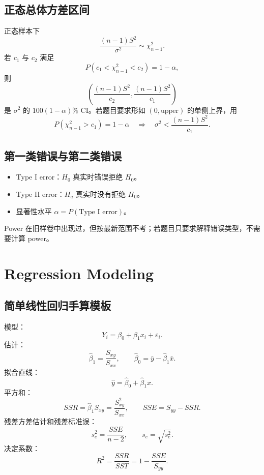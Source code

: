 \documentclass[11pt,a4paper]{article}
\begin{document}
\subsection{正态总体方差区间}

\begin{templatebox}[若题目要求方差的区间估计]
正态样本下
\[
  \frac{(n-1)S^2}{\sigma^2}\sim\chi^2_{n-1}.
\]
若 $c_1$ 与 $c_2$ 满足
\[
  P(c_1<\chi^2_{n-1}<c_2)=1-\alpha,
\]
则
\[
  \boxed{
  \left(
    \frac{(n-1)S^2}{c_2},
    \frac{(n-1)S^2}{c_1}
  \right)
  }
\]
是 $\sigma^2$ 的 $100(1-\alpha)\%$ CI。若题目要求形如 $(0,\mathrm{upper})$ 的单侧上界，用
\[
  P\!\left(\chi^2_{n-1}>c_1\right)=1-\alpha
  \quad\Rightarrow\quad
  \sigma^2<\frac{(n-1)S^2}{c_1}.
\]
\end{templatebox}

\subsection{第一类错误与第二类错误}

\begin{memorybox}[定义]
\begin{itemize}
  \item Type I error：$H_0$ 真实时错误拒绝 $H_0$。
  \item Type II error：$H_a$ 真实时没有拒绝 $H_0$。
  \item 显著性水平 $\alpha=P(\text{Type I error})$。
\end{itemize}
Power 在旧样卷中出现过，但按最新范围不考；若题目只要求解释错误类型，不需要计算 power。
\end{memorybox}

\section{Regression Modeling}

\subsection{简单线性回归手算模板}

\begin{methodbox}[给出汇总统计量时]
模型：
\[
  Y_i=\beta_0+\beta_1x_i+\varepsilon_i.
\]
估计：
\[
  \hat\beta_1=\frac{S_{xy}}{S_{xx}},
  \qquad
  \hat\beta_0=\bar y-\hat\beta_1\bar x.
\]
拟合直线：
\[
  \hat y=\hat\beta_0+\hat\beta_1x.
\]
平方和：
\[
  SSR=\hat\beta_1S_{xy}=\frac{S_{xy}^2}{S_{xx}},
  \qquad
  SSE=S_{yy}-SSR.
\]
残差方差估计和残差标准误：
\[
  s_e^2=\frac{SSE}{n-2},
  \qquad
  s_e=\sqrt{s_e^2}.
\]
决定系数：
\[
  R^2=\frac{SSR}{SST}=1-\frac{SSE}{S_{yy}}.
\]
\end{methodbox}
\end{document}
